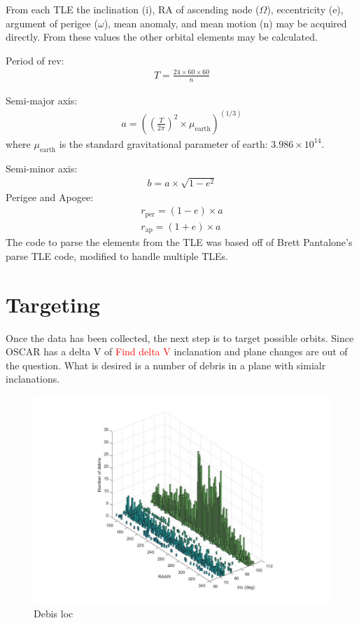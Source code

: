 \documentclass[12pt]{article}
\begin{document}
			
		
		From each TLE the inclination (i), RA of ascending node ($\Omega$), eccentricity (e), argument of perigee ($\omega$), mean anomaly, and mean motion (n) may be acquired directly. From these values the other orbital elements may be calculated. 
		
		Period of rev:
		\begin{align}
		T=\frac{24\times60\times60}{n}
		\end{align}
		
		Semi-major axis:
		\begin{align}
		a=\left(\left(\frac{T}{2\pi}\right)^2 \times \mu_\text{earth}\right)^{(1/3)}
		\end{align}
		where $\mu_\text{earth}$ is the standard gravitational parameter of earth: $3.986\times10^{14}$. 
		
		Semi-minor axis:
		\begin{align}
		b=a\times\sqrt{1-e^2}
		\end{align}
		Perigee and Apogee:
		\begin{align}
		r_\text{per}=\left(1-e\right)\times a\\
		r_\text{ap}=\left(1+e\right)\times a
		\end{align}
		The code to parse the elements from the TLE was based off of Brett Pantalone's parse TLE code\cite{codeParseTLE}, modified to handle multiple TLEs.
		
		\section{Targeting}
		Once the data has been collected, the next step is to target possible orbits. Since OSCAR has a delta V of \textcolor{red}{Find delta V} inclanation and plane changes are out of the question. What is desired is a number of debris in a plane with simialr inclanations.
		
		\begin{figure}[!]
			\centering
			\includegraphics[width=0.7\linewidth]{rann_inc}
			\caption{Debis loc}
			\label{fig:ranninc}
		\end{figure}
		
\end{document}
